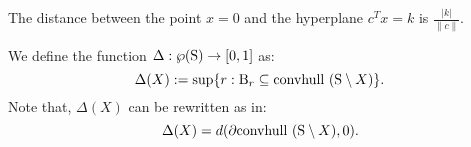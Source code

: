 

\begin{proposition}\label{prop:distance}The distance between the point $x=0$ and the hyperplane $c^Tx = k$ is $\frac{|k|}{\|c\|}$.
\end{proposition}



We define the function $\Delta: \wp(\text{S}) \to [0,1]$ as:
\begin{equation}\label{shrinkage}
\Delta(X) := \sup \{r: \text{B}_r \subseteq \mbox{convhull }(\text{S} \setminus X)\}.\end{equation}
Note that, $\Delta(X)$ can be rewritten as in:
\begin{equation}\label{shrinkage2}
\Delta(X) =  d(\partial  \mbox{convhull }(\text{S} \setminus X), 0).
\end{equation}


